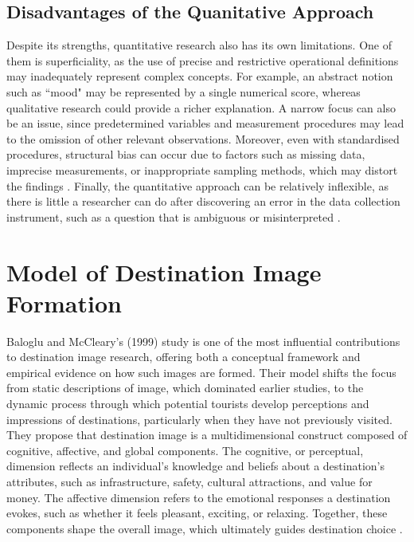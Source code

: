 \documentclass[a4paper, 12pt, twoside]{report}  %
\begin{document}
\subsection{Disadvantages of the Quanitative Approach}

\indent Despite its strengths, quantitative research also has its own limitations. One of them is superficiality, as the use of precise and restrictive operational definitions may inadequately represent complex concepts. For example, an abstract notion such as ``mood" may be represented by a single numerical score, whereas qualitative research could provide a richer explanation. A narrow focus can also be an issue, since predetermined variables and measurement procedures may lead to the omission of other relevant observations. Moreover, even with standardised procedures, structural bias can occur due to factors such as missing data, imprecise measurements, or inappropriate sampling methods, which may distort the findings \cite{scribbrquant}. Finally, the quantitative approach can be relatively inflexible, as there is little a researcher can do after discovering an error in the data collection instrument, such as a question that is ambiguous or misinterpreted \cite{carsonetal}.

\section{Model of Destination Image Formation}

\indent Baloglu and McCleary’s (1999) study is one of the most influential contributions to destination image research, offering both a conceptual framework and empirical evidence on how such images are formed. Their model shifts the focus from static descriptions of image, which dominated earlier studies, to the dynamic process through which potential tourists develop perceptions and impressions of destinations, particularly when they have not previously visited. They propose that destination image is a multidimensional construct composed of cognitive, affective, and global components. The cognitive, or perceptual, dimension reflects an individual’s knowledge and beliefs about a destination’s attributes, such as infrastructure, safety, cultural attractions, and value for money. The affective dimension refers to the emotional responses a destination evokes, such as whether it feels pleasant, exciting, or relaxing. Together, these components shape the overall image, which ultimately guides destination choice \cite{destinationimg}.
\end{document}
